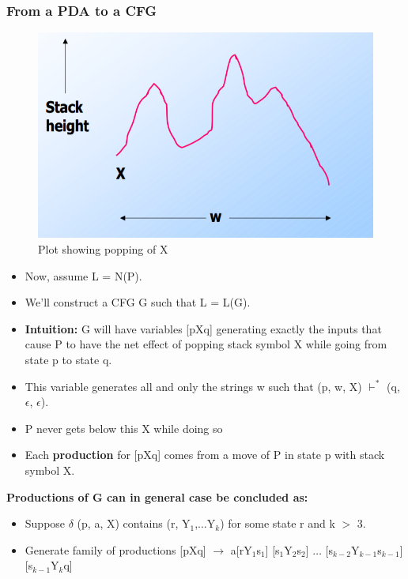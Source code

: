 \documentclass{report}
\begin{document}
\subsubsection{From a PDA to a CFG}
\begin{center}
    \begin{figure}[h]
    \centering
        \includegraphics[scale=0.5]{popX.png}
        \caption{Plot showing popping of X}
        \label{fig:my_label}
    \end{figure}
    \end{center}
\begin{itemize}
    \item Now, assume L = N(P).
    \item We’ll construct a CFG G such that L = L(G).
    \item \textbf{Intuition:} G will have variables [pXq] generating exactly the inputs that cause P to have the net effect of popping stack symbol X while going from state p to state q.
    \item This variable generates all and only the strings w such that (p, w, X) $\vdash^*$ (q, $\epsilon$, $\epsilon$).
    \item P never gets below this X while doing so
    \item Each \textbf{production} for [pXq] comes from a move of P in state p with stack symbol X. 
\end{itemize}
\textbf{Productions of G can in general case be concluded as:}
\begin{itemize}
    \item Suppose $\delta$ (p, a, X) contains (r, Y$_1$,$\ldots$Y$_k$) for some state r and k $>$ 3.
    \item Generate family of productions [pXq] $\rightarrow$ a[rY$_1$s$_1$] [s$_1$Y$_2$s$_2$] $\ldots$ [s$_{k-2}$Y$_{k-1}$s$_{k-1}$][s$_{k-1}$Y$_{k}$q]
\end{itemize}
\end{document}
